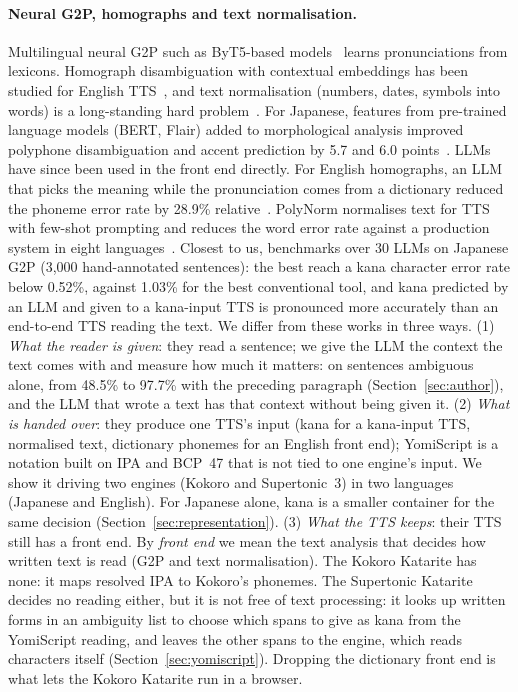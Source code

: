 \documentclass[11pt,a4paper]{article}
\begin{document}
\paragraph{Neural G2P, homographs and text normalisation.} Multilingual neural G2P such as ByT5-based
models~\citep{zhu2022byt5g2p} learns pronunciations from lexicons. Homograph disambiguation with contextual
embeddings has been studied for English TTS~\citep{nicolis2021homograph}, and text normalisation (numbers, dates,
symbols into words) is a long-standing hard problem~\citep{sproat2016normalization}. For Japanese, features from
pre-trained language models (BERT, Flair) added to morphological analysis improved polyphone disambiguation and accent
prediction by 5.7 and 6.0 points~\citep{hida2022polyphone}. LLMs have since been used in the front end directly. For
English homographs, an LLM that picks the meaning while the pronunciation comes from a dictionary reduced the phoneme
error rate by 28.9\% relative~\citep{han2024ickr}. PolyNorm normalises text for TTS with few-shot prompting and reduces
the word error rate against a production system in eight languages~\citep{wong2025polynorm}. Closest to us,
\citet{koriyama2026g2p} benchmarks over 30 LLMs on Japanese G2P (3{,}000 hand-annotated sentences): the best reach a
kana character error rate below 0.52\%, against 1.03\% for the best conventional tool, and kana predicted by an LLM and
given to a kana-input TTS is pronounced more accurately than an end-to-end TTS reading the text. We differ from these
works in three ways. (1) \emph{What the reader is given}: they read a sentence; we give the LLM the context the text
comes with and measure how much it matters: on sentences ambiguous alone, from 48.5\% to 97.7\% with the preceding
paragraph (Section~\ref{sec:author}), and the LLM that wrote a text has that context without being given it.
(2) \emph{What is handed over}: they produce one TTS's input (kana for a kana-input TTS, normalised text, dictionary
phonemes for an English front end); YomiScript is a notation built on IPA and BCP~47 that is not tied to one engine's
input. We show it driving two engines (Kokoro and Supertonic~3) in two languages (Japanese and English). For Japanese
alone, kana is a smaller container for the same decision (Section~\ref{sec:representation}).
(3) \emph{What the TTS keeps}: their TTS still has a front end. By \emph{front end} we mean the text analysis that
decides how written text is read (G2P and text normalisation). The Kokoro Katarite has none: it maps resolved IPA to
Kokoro's phonemes. The Supertonic Katarite decides no reading either, but it is not free of text processing: it looks
up written forms in an ambiguity list to choose which spans to give as kana from the YomiScript reading, and leaves
the other spans to the engine, which reads characters itself (Section~\ref{sec:yomiscript}). Dropping the dictionary
front end is what lets the Kokoro Katarite run in a browser.
\end{document}
